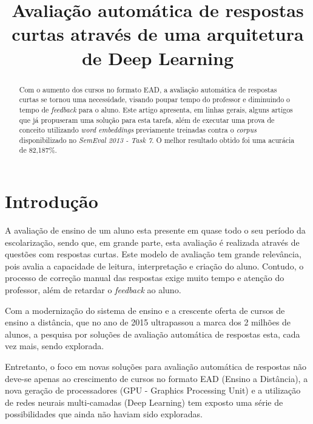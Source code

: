 \documentclass[conference]{IEEEtran}
\begin{document}
\title{Avaliação automática de respostas curtas através de uma arquitetura de Deep Learning}


\author{
}


\maketitle

\begin{abstract}
Com o aumento dos cursos no formato EAD, a avaliação automática de respostas curtas se tornou uma necessidade, visando poupar tempo do professor e diminuindo o tempo de \textit{feedback} para o aluno. Este artigo apresenta, em linhas gerais, alguns artigos que já propuseram uma solução para esta tarefa, além de executar uma prova de conceito utilizando \textit{word embeddings} previamente treinadas contra o \textit{corpus} disponibilizado no \textit{SemEval 2013 - Task 7}. O melhor resultado obtido foi uma acurácia de 82,187\%.
\end{abstract}



\IEEEpeerreviewmaketitle



\section{Introdução}
A avaliação de ensino de um aluno esta presente em quase todo o seu período da escolarização, sendo que, em grande parte, esta avaliação é realizada através de questões com respostas curtas. Este modelo de avaliação tem grande relevância, pois avalia a capacidade de leitura, interpretação e criação do aluno. Contudo, o processo de correção manual das respostas exige muito tempo e atenção do professor, além de retardar o \textit{feedback} ao aluno\cite{Santos:2012}.

Com a modernização do sistema de ensino e a crescente oferta de cursos de ensino a distância, que no ano de 2015 ultrapassou a marca dos 2 milhões de alunos\cite{ABED:2015}, a pesquisa por soluções de avaliação automática de respostas esta, cada vez mais, sendo explorada.

Entretanto, o foco em novas soluções para avaliação automática de respostas não deve-se apenas ao crescimento de cursos no formato EAD (Ensino a Distância), a nova geração de processadores (GPU - Graphics Processing Unit) e a utilização de redes neurais multi-camadas (Deep Learning) tem exposto uma série de possibilidades que ainda não haviam sido exploradas.
\end{document}
